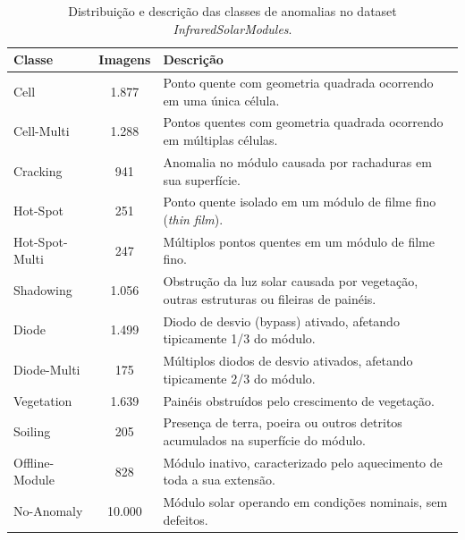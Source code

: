\documentclass[a4paper,11pt]{article}
\begin{document}
\begin{table}[htpb]
	\centering
	\caption{Distribuição e descrição das classes de anomalias no dataset \textit{InfraredSolarModules}.}
	\label{tab:classes_dataset}
	\vspace{0.2cm}
	\begin{tabular}{l c p{9cm}}
		\hline
		\textbf{Classe} & \textbf{Imagens} & \textbf{Descrição}                                                                      \\
		\hline
		Cell            & 1.877            & Ponto quente com geometria quadrada ocorrendo em uma única célula.                      \\
		Cell-Multi      & 1.288            & Pontos quentes com geometria quadrada ocorrendo em múltiplas células.                   \\
		Cracking        & 941              & Anomalia no módulo causada por rachaduras em sua superfície.                            \\
		Hot-Spot        & 251              & Ponto quente isolado em um módulo de filme fino (\textit{thin film}).                   \\
		Hot-Spot-Multi  & 247              & Múltiplos pontos quentes em um módulo de filme fino.                                    \\
		Shadowing       & 1.056            & Obstrução da luz solar causada por vegetação, outras estruturas ou fileiras de painéis. \\
		Diode           & 1.499            & Diodo de desvio (bypass) ativado, afetando tipicamente 1/3 do módulo.                   \\
		Diode-Multi     & 175              & Múltiplos diodos de desvio ativados, afetando tipicamente 2/3 do módulo.                \\
		Vegetation      & 1.639            & Painéis obstruídos pelo crescimento de vegetação.                                       \\
		Soiling         & 205              & Presença de terra, poeira ou outros detritos acumulados na superfície do módulo.        \\
		Offline-Module  & 828              & Módulo inativo, caracterizado pelo aquecimento de toda a sua extensão.                  \\
		No-Anomaly      & 10.000           & Módulo solar operando em condições nominais, sem defeitos.                              \\
		\hline
	\end{tabular}
\end{table}
\clearpage
\end{document}
